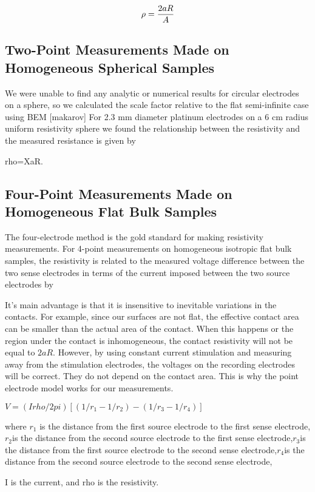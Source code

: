 $$\rho = {2 a R \over A} $$

\subsection{Two-Point Measurements Made on Homogeneous Spherical Samples}

We were unable to find any analytic or numerical results for circular electrodes on a sphere, so we calculated the scale factor relative to the flat semi-infinite case using BEM [makarov] For 2.3 mm diameter platinum electrodes on a 6 cm radius uniform resistivity sphere we found the relationship between the resistivity and the measured resistance is given by

rho=XaR.

\subsection{Four-Point Measurements Made on Homogeneous Flat Bulk Samples}

The four-electrode method is the gold standard for making resistivity measurements. For 4-point measurements on homogeneous isotropic flat bulk samples, the resistivity is related to the measured voltage difference between the two sense electrodes in terms of the current imposed between the two source electrodes by \cite{Miccoli2015}

It's main advantage is that it is insensitive to inevitable variations in the contacts. For example, since our surfaces are not flat, the effective contact area can be smaller than the actual area of the
contact. When this happens or the region under the contact is inhomogeneous, the contact resistivity will not be equal to $2aR$. However, by using constant current stimulation and measuring away from the stimulation electrodes, the voltages on the recording electrodes will be correct. They do not depend on the contact area. This is why the point electrode model works for our measurements.


$ V = (I rho / 2 pi) [ (1/r_1 - 1/r_2) - (1/r_3 - 1/r_4) ] $

where $r_1$ is the distance from the first source electrode to the first sense electrode,$ r_2 $is the distance from the second source electrode to the first sense electrode,$ r_3 $is the distance from the first source electrode to the second sense electrode,$ r_4 $is the distance from the second source electrode to the second sense electrode,

I is the current, and rho is the resistivity.

